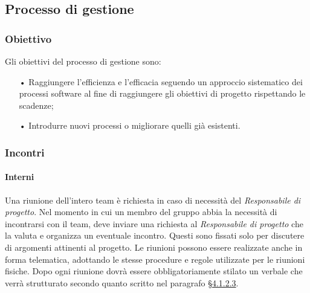\subsection{Processo di gestione}
\subsubsection{Obiettivo}
Gli obiettivi del processo di gestione sono:
\begin{itemize}
\item[•] Raggiungere l’efficienza e l’efficacia seguendo un approccio sistematico dei processi software al fine di raggiungere 
        gli obiettivi di progetto rispettando le scadenze;
\item[•] Introdurre nuovi processi o migliorare quelli già esistenti.
\end{itemize}

\subsubsection{Incontri}

\paragraph{Interni}
\label{sec:interni}
Una riunione dell'intero team è richiesta in caso di necessità del \textit{Responsabile di progetto}. Nel momento in cui un 
membro del gruppo abbia la necessità di incontrarsi con il team, deve inviare una richiesta al \textit{Responsabile di progetto} 
che la valuta e organizza un eventuale incontro. Questi sono fissati solo per discutere di argomenti attinenti al progetto.
Le riunioni possono essere realizzate anche in forma {telematica}, adottando le stesse procedure e regole utilizzate per 
le riunioni fisiche. Dopo ogni riunione dovrà essere obbligatoriamente stilato un verbale che verrà strutturato secondo 
quanto scritto nel paragrafo \hyperref[sec:verbali]{§4.1.2.3}.
